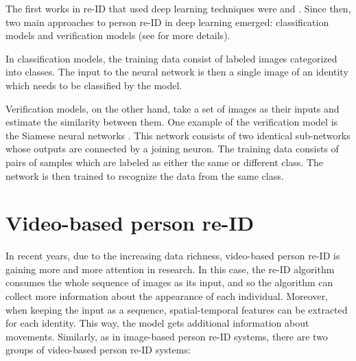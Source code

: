 The first works in re-ID that used deep learning techniques were \cite{deep_for_re_id} and \cite{deep_filters_for_re_id}. Since then, two main approaches to person re-ID in deep learning emerged: classification  models and verification models (see \cite{Zheng_past_pres_future} for more details). 

In classification models, the training data consist of labeled images categorized into classes. The input to the neural network is then a single image of an identity which needs to be classified by the model. 

Verification models, on the other hand, take a set of images as their inputs and estimate the similarity between them. One example of the verification model is the Siamese neural networks \cite{siamese_network}. This network consists of two identical sub-networks whose outputs are connected by a joining neuron. The training data consists of pairs of samples which are labeled as either the same or different class. The network is then trained to recognize the data from the same class.

\section{Video-based person re-ID}
In recent years, due to the increasing data richness, video-based person re-ID is gaining more and more attention in research. In this case, the re-ID algorithm consumes the whole sequence of images as its input, and so the algorithm can collect more information about the appearance of each individual. Moreover, when keeping the input as a sequence, spatial-temporal features can be extracted for each identity. This way, the model gets additional information about movements. Similarly, as in image-based person re-ID systems, there are two groups of video-based person re-ID systems:
